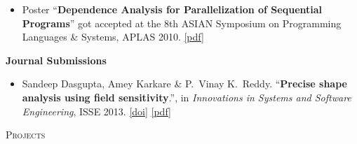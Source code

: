 \documentclass[9pt]{article}
\newenvironment{changemargin}[2]{%
  \begin{list}{}{%
    \setlength{\topsep}{0pt}%
    \setlength{\leftmargin}{#1}%
    \setlength{\rightmargin}{#2}%
    \setlength{\listparindent}{\parindent}%
    \setlength{\itemindent}{\parindent}%
    \setlength{\parsep}{\parskip}%
  }%
  \item[]}{\end{list}
}
\newcommand{\lineover}{
	\begin{changemargin}{-0.05in}{-0.05in}
		\vspace*{-8pt}
		\hrulefill \\
		\vspace*{-2pt}
	\end{changemargin}
}
\newcommand{\header}[1]{
	\begin{changemargin}{-0.5in}{-0.5in}
		\scshape{#1}\\
  	\lineover
	\end{changemargin}
}
\newenvironment{body} {
	\vspace*{-16pt}
	\begin{changemargin}{-0.25in}{-0.5in}
  }	
	{\end{changemargin}
}
\begin{document}
\begin{body}
\begin{itemize}
                \item Poster ``\textbf{Dependence Analysis for Parallelization
                  of Sequential Programs}'' got accepted at the 8th ASIAN
                  Symposium on Programming Languages \& Systems, APLAS 2010.
                  \href{http://webhost.engr.illinois.edu/~sdasgup3/Document/poster_APLAS2010.pdf}{[pdf]}
	\end{itemize}

\textbf{Journal Submissions}\\
	\vspace{-4pt}
	\begin{itemize} \itemsep -0pt
		\item  Sandeep Dasgupta, Amey Karkare \& P.\ Vinay K.\ Reddy. ``\textbf{Precise shape analysis using field sensitivity}.'', in \emph{Innovations in Systems and Software Engineering}, ISSE 2013.
                 \href{http://www.springerlink.com/openurl.asp?genre=article&id=doi:10.1007/s11334-013-0198-7}{[doi]}
                 \href{http://webhost.engr.illinois.edu/~sdasgup3/Document/publication_isse.pdf}{[pdf]}
	\end{itemize}
\end{body}

\smallskip

\header{Projects}
\end{document}
